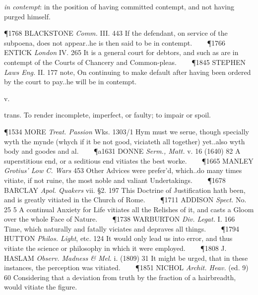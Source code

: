 \begin{description}[wide, labelwidth=!, labelindent=0pt]
\begin{myenumerate}
 \textit{in contempt}: in the position of having committed contempt, and not having purged himself.

\P 1768 BLACKSTONE  \textit{Comm.} III. 443 If the defendant, on service of the subpoena, does not appear..he is then said to be in contempt.    
\P 1766 ENTICK  \textit{London} IV. 265 It is a general court for debtors, and such as are in contempt of the Courts of Chancery and Common-pleas.    
\P 1845 STEPHEN  \textit{Laws Eng.} II. 177 note, On continuing to make default after having been ordered by the court to pay..he will be in contempt.
\end{myenumerate}


 v.

\noindent {}

\vspace{-0.3cm}

\begin{myenumerate}

 trans. To render incomplete, imperfect, or faulty; to impair or spoil.

\P 1534 MORE  \textit{Treat. Passion} Wks. 1303/1 Hym must we serue, though specially wyth the mynde (whych if it be not good, viciateth all together) yet..also wyth body and goodes and al.    
\P a1631 DONNE  \textit{Serm., Matt.} v. 16 (1640) 82 A superstitious end, or a seditious end vitiates the best worke.    
\P 1665 MANLEY  \textit{Grotius' Low C. Wars} 453 Other Advices were prefer'd, which..do many times vitiate, if not ruine, the most noble and valiant Undertakings.    
\P 1678 BARCLAY  \textit{Apol. Quakers} vii. §2. 197 This Doctrine of Justification hath been, and is greatly vitiated in the Church of Rome.    
\P 1711 ADDISON  \textit{Spect.} No. 25 5 A continual Anxiety for Life vitiates all the Relishes of it, and casts a Gloom over the whole Face of Nature.    
\P 1738 WARBURTON  \textit{Div. Legat.} I. 166 Time, which naturally and fatally viciates and depraves all things.    
\P 1794 HUTTON  \textit{Philos. Light}, etc. 124 It would only lead us into error, and thus vitiate the science or philosophy in which it were employed.    
\P 1808 J. HASLAM  \textit{Observ. Madness \& Mel.} i. (1809) 31 It might be urged, that in these instances, the perception was vitiated.    
\P 1851 NICHOL  \textit{Archit. Heav.} (ed. 9) 60 Considering that a deviation from truth by the fraction of a hairbreadth, would vitiate the figure.


\end{myenumerate}
\end{description}
